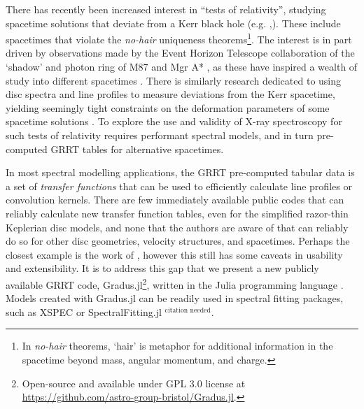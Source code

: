 \documentclass[fleqn,usenatbib]{mnras}
\newcommand{\citneeded}{{\bf \color{red} $^{\text{citation needed}}$}}
\newcommand{\Gradus}{Gradus.jl\xspace}
\begin{document}
There has recently been increased interest in ``tests of relativity'', studying
spacetime solutions that deviate from a Kerr black hole (e.g.
\citealt{johannsen_testing_2010, chrusciel_stationary_2012, bambi_testing_2022,
patra_accretion_2023, chen_observational_2024},). These include spacetimes that
violate the \textit{no-hair} uniqueness theorems\footnote{In \emph{no-hair}
theorems, `hair' is metaphor for additional information in the spacetime beyond
mass, angular momentum, and charge.}. The interest is in part driven by
observations made by the Event Horizon Telescope collaboration of the `shadow'
and photon ring of M87 and Mgr A*
\citep{the_event_horizon_telescope_collaboration_first_2019,
the_event_horizon_telescope_collaboration_first_2023}, as these have inspired a
wealth of study into different spacetimes \citep[see][]{eht_non_kerr_2022}.
There is similarly research dedicated to using disc spectra and line profiles to
measure deviations from the Kerr spacetime, yielding seemingly tight constraints
on the deformation parameters of some spacetime solutions
\citep[e.g.][]{bambi_precision_measuremets_2021}. To explore the use and
validity of X-ray spectroscopy for such tests of relativity requires performant
spectral models, and in turn pre-computed GRRT tables for alternative
spacetimes.

In most spectral modelling applications, the GRRT pre-computed tabular data is a
set of \textit{transfer functions} that can be used to efficiently calculate
line profiles or convolution kernels. There are few immediately available public
codes that can reliably calculate new transfer function tables, even for the
simplified razor-thin Keplerian disc models, and none that the authors are aware
of that can reliably do so for other disc geometries, velocity structures, and
spacetimes. Perhaps the closest example is the work of
\citep{taylor_exploring_2018}, however this still has some caveats in usability
and extensibility. It is to address this gap that we present a new publicly
available GRRT code, Gradus.jl\footnote{Open-source and available under GPL 3.0
license at \url{https://github.com/astro-group-bristol/Gradus.jl}.}, written in
the Julia programming language \citep{Bezanson_Julia_A_fresh_2017}. Models
created with \Gradus can be readily used in spectral fitting packages, such as
XSPEC \citep{arnaud_xspec_1996} or SpectralFitting.jl \citneeded.

\end{document}

